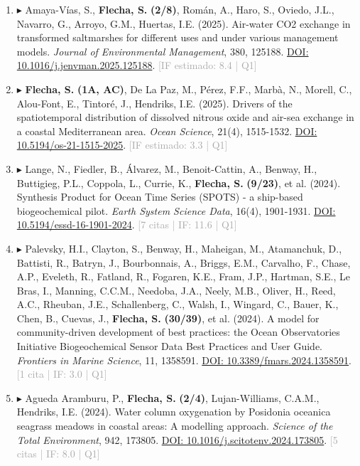 \documentclass[11pt,a4paper]{article}
\begin{document}
\begin{enumerate}[leftmargin=*]
\item $\blacktriangleright$ Amaya-Vías, S., \textbf{Flecha, S.} \textbf{(2/8)}, Román, A., Haro, S., Oviedo, J.L., Navarro, G., Arroyo, G.M., Huertas, I.E. (2025). Air-water CO2 exchange in transformed saltmarshes for different uses and under various management models. \textit{Journal of Environmental Management}, 380, 125188. \href{https://doi.org/10.1016/j.jenvman.2025.125188}{DOI: 10.1016/j.jenvman.2025.125188}. \textcolor{darkgray}{\small [IF estimado: 8.4 | Q1]}

\item $\blacktriangleright$ \textbf{Flecha, S.} \textbf{(1A, AC)}, De La Paz, M., Pérez, F.F., Marbà, N., Morell, C., Alou-Font, E., Tintoré, J., Hendriks, I.E. (2025). Drivers of the spatiotemporal distribution of dissolved nitrous oxide and air-sea exchange in a coastal Mediterranean area. \textit{Ocean Science}, 21(4), 1515-1532. \href{https://doi.org/10.5194/os-21-1515-2025}{DOI: 10.5194/os-21-1515-2025}. \textcolor{darkgray}{\small [IF estimado: 3.3 | Q1]}

\item $\blacktriangleright$ Lange, N., Fiedler, B., Álvarez, M., Benoit-Cattin, A., Benway, H., Buttigieg, P.L., Coppola, L., Currie, K., \textbf{Flecha, S.} \textbf{(9/23)}, et al. (2024). Synthesis Product for Ocean Time Series (SPOTS) - a ship-based biogeochemical pilot. \textit{Earth System Science Data}, 16(4), 1901-1931. \href{https://doi.org/10.5194/essd-16-1901-2024}{DOI: 10.5194/essd-16-1901-2024}. \textcolor{darkgray}{\small [7 citas | IF: 11.6 | Q1]}

\item $\blacktriangleright$ Palevsky, H.I., Clayton, S., Benway, H., Maheigan, M., Atamanchuk, D., Battisti, R., Batryn, J., Bourbonnais, A., Briggs, E.M., Carvalho, F., Chase, A.P., Eveleth, R., Fatland, R., Fogaren, K.E., Fram, J.P., Hartman, S.E., Le Bras, I., Manning, C.C.M., Needoba, J.A., Neely, M.B., Oliver, H., Reed, A.C., Rheuban, J.E., Schallenberg, C., Walsh, I., Wingard, C., Bauer, K., Chen, B., Cuevas, J., \textbf{Flecha, S.} \textbf{(30/39)}, et al. (2024). A model for community-driven development of best practices: the Ocean Observatories Initiative Biogeochemical Sensor Data Best Practices and User Guide. \textit{Frontiers in Marine Science}, 11, 1358591. \href{https://doi.org/10.3389/fmars.2024.1358591}{DOI: 10.3389/fmars.2024.1358591}. \textcolor{darkgray}{\small [1 cita | IF: 3.0 | Q1]}

\item $\blacktriangleright$ Agueda Aramburu, P., \textbf{Flecha, S.} \textbf{(2/4)}, Lujan-Williams, C.A.M., Hendriks, I.E. (2024). Water column oxygenation by Posidonia oceanica seagrass meadows in coastal areas: A modelling approach. \textit{Science of the Total Environment}, 942, 173805. \href{https://doi.org/10.1016/j.scitotenv.2024.173805}{DOI: 10.1016/j.scitotenv.2024.173805}. \textcolor{darkgray}{\small [5 citas | IF: 8.0 | Q1]}


\end{enumerate}
\end{document}
